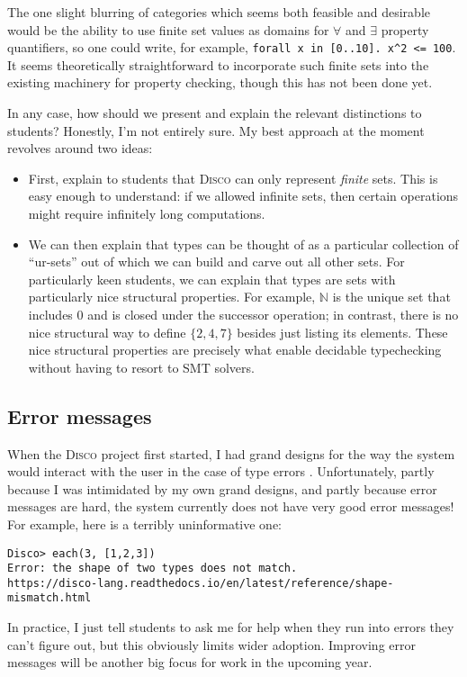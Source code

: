 \documentclass[submission,copyright,creativecommons]{eptcs}
\newcommand{\disco}{\textsc{Disco}\xspace}
\newcommand{\N}{\mathbb{N}}
\begin{document}
The one slight blurring of categories which seems both feasible and
desirable would be the ability to use finite set values as domains for
$\forall$ and $\exists$ property quantifiers, so one could write, for
example, \texttt{forall x in [0..10]. x^2 <= 100}.  It seems
theoretically straightforward to incorporate such finite sets into the
existing machinery for property checking, though this has not been
done yet.

In any case, how should we present and explain the relevant
distinctions to students?  Honestly, I'm not entirely sure.  My best
approach at the moment revolves around two ideas:
\begin{itemize}
\item First, explain to students that \disco can only represent
  \emph{finite} sets.  This is easy enough to understand: if we
  allowed infinite sets, then certain operations might require
  infinitely long computations.
\item We can then explain that types can be thought of as a particular
  collection of ``ur-sets'' out of which we can build and carve out
  all other sets.  For particularly keen students, we can explain that
  types are sets with particularly nice structural properties.  For
  example, $\N$ is the unique set that includes $0$ and is closed
  under the successor operation; in contrast, there is no nice
  structural way to define $\{2,4,7\}$ besides just listing its
  elements.  These nice structural properties are precisely what
  enable decidable typechecking without having to resort to SMT
  solvers.
\end{itemize}

\subsection{Error messages}
\label{sec:errors}

When the \disco project first started, I had grand designs for the way
the system would interact with the user in the case of type errors
\cite{yorgey2018explaining}. Unfortunately, partly because I was
intimidated by my own grand designs, and partly because error messages
are hard, the system currently does not have very good error messages!
For example, here is a terribly uninformative one:
\begin{verbatim}
Disco> each(3, [1,2,3])
Error: the shape of two types does not match.
https://disco-lang.readthedocs.io/en/latest/reference/shape-mismatch.html
\end{verbatim}
In practice, I just tell students to ask me for help when they run
into errors they can't figure out, but this obviously limits wider
adoption.  Improving error messages will be another big focus for work
in the upcoming year.
\end{document}
